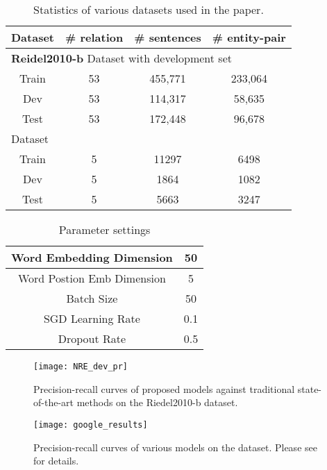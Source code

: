\documentclass{article}
\begin{document}
\begin{table}[t]
\scriptsize
      \centering
        \begin{tabular}{|c|c|c|c|}
          \hline
          Dataset           & \# relation & \# sentences   & \# entity-pair \\ \hline
\multicolumn{4}{|l|}{\textbf{Reidel2010-b} Dataset with development set} \\ \hline
          Train & 53 &  455,771 &  233,064 \\ \hline
          Dev & 53 &  114,317 & 58,635  \\ \hline
          Test & 53 & 172,448 & 96,678 \\ \hline
          \multicolumn{4}{|l|}{\textbf{\newdatasetshort{}}  Dataset} \\ \hline
          Train & 5 & 11297 & 6498 \\ \hline          
          Dev & 5 & 1864 & 1082\\ \hline
          Test & 5 & 5663 & 3247 \\ \hline
        \end{tabular}
        \caption{\label{tab:ds_dataset_summary}Statistics of various datasets used in the paper.}
\end{table}
\begin{table}[t]
      \scriptsize
      \centering
        \begin{tabular}{|c|c|}
          \hline        
          Word Embedding Dimension & 50 \\ \hline
          Word Postion Emb Dimension & 5 \\ \hline
          Batch Size & 50 \\ \hline
          SGD Learning Rate & 0.1 \\ \hline
          Dropout Rate & 0.5 \\ \hline
        \end{tabular}
        \caption{\label{tab:paramters}Parameter settings}
\end{table}



\begin{figure}[t]
\centering
  \setlength{\textfloatsep}{0.30cm}
  \texttt{[image: NRE\_dev\_pr]}
  \caption{\label{fig:nre_dataset_results}Precision-recall curves of proposed models against traditional state-of-the-art methods on the Riedel2010-b dataset. }
 \end{figure}
 
\begin{figure}[t]
\centering
  \setlength{\textfloatsep}{0.30cm}
  \texttt{[image: google\_results]}
  \caption{\label{fig:new_dataset_results}Precision-recall curves of various models on the \newdatasetshort{} dataset. Please see  for details.}
\end{figure}
\end{document}
